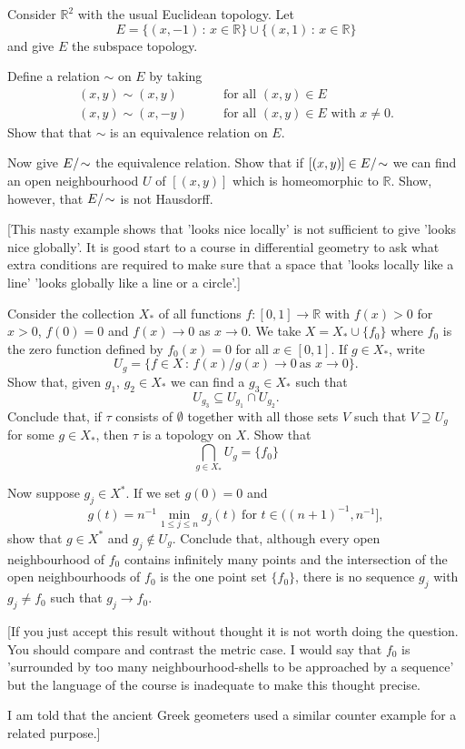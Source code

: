 \begin{exercise}\label{E;nasty line} 
Consider ${\mathbb R}^{2}$ 
with the usual Euclidean topology.
Let
\[E=\{(x,-1)\,:\,x\in{\mathbb R}\}\cup
\{(x,1)\,:\,x\in{\mathbb R}\}\]
and give $E$ the subspace topology.

Define a relation $\sim$ on $E$ by taking 
\begin{align*}
(x,y)\sim(x,y)&\qquad\text{for all $(x,y)\in E$}\\
(x,y)\sim(x,-y)&\qquad\text{for all $(x,y)\in E$ with $x\neq 0$}.
\end{align*}
Show that that $\sim$ is an equivalence relation on $E$.

Now give $E/\negthinspace\sim$ the equivalence relation. Show
that if $[(x,y)]\in E/\negthinspace\sim$ we can find an open neighbourhood
$U$ of $[(x,y)]$ which is homeomorphic to ${\mathbb R}$.
Show, however, that $E/\negthinspace\sim$ is not Hausdorff.

[This nasty example shows that 'looks nice locally'
is not sufficient to give 'looks nice globally'.
It is good start to a course in differential geometry
to ask what extra conditions are required to make
sure that a space that 'looks locally like a line'
'looks globally like a line or a circle'.]
\end{exercise}
\begin{exercise}\label{E;large set} 
Consider the collection $X_{*}$ of all 
functions
$f:[0,1]\rightarrow{\mathbb R}$ with $f(x)>0$ for $x>0$,
$f(0)=0$ and $f(x)\rightarrow 0$ as $x\rightarrow 0$.
We take $X=X_{*}\cup\{f_{0}\}$ where $f_{0}$ is
the zero function
defined by $f_{0}(x)=0$ for all $x\in [0,1]$.
If $g\in X_{*}$, write
\[U_{g}=\{f\in X\,:\, f(x)/g(x)\rightarrow 0
\ \text{as $x\rightarrow 0$}\}.\]
Show that, given  $g_{1},\,g_{2}\in X_{*}$ we can find 
a $g_{3}\in X_{*}$ such that 
\[U_{g_{3}}\subseteq U_{g_{1}}\cap U_{g_{2}}.\]
Conclude that, if $\tau$ consists of $\emptyset$ together
with all those sets $V$ such that $V\supseteq U_{g}$ for
some $g\in X_{*}$, then $\tau$ is a topology on $X$.
Show that 
\[\bigcap_{g\in X_{*}}U_{g}=\{f_{0}\}\]

Now suppose $g_{j}\in X^{*}$.
If we set $g(0)=0$ and
\[g(t)=n^{-1}\min_{1\leq j\leq n}g_{j}(t)
\ \text{for $t\in\big((n+1)^{-1},n^{-1}\big]$},\]
show that $g\in X^{*}$ and $g_{j}\notin U_{g}$.
Conclude that, although every open neighbourhood
of $f_{0}$ contains infinitely many points
and the intersection of the open neighbourhoods of
$f_{0}$ is the one point set $\{f_{0}\}$, there is no sequence 
$g_{j}$ with $g_{j}\neq f_{0}$ such that
$g_{j}\rightarrow f_{0}$.
 
[If you just accept this result without thought it
is not worth doing the question. You should compare
and contrast the metric case. I would say that $f_{0}$
is 'surrounded by too many neighbourhood-shells to be approached
by a sequence' but the language of the course is inadequate
to make this thought precise.

I am told that the ancient Greek geometers used a similar
counter example for a related purpose.]
\end{exercise}

